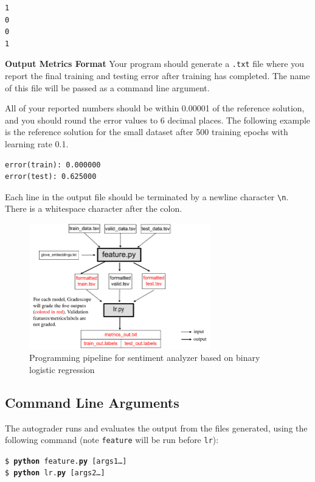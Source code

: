 \documentclass[11pt,addpoints,answers]{exam}
\begin{document}
\begin{lstlisting}
1
0
0
1
\end{lstlisting}

{\bf Output Metrics Format }
Your program should generate a \texttt{.txt} file where you report the final training and testing error after training has completed. The name of this file will be passed as a command line argument.

All of your reported numbers should be within 0.00001 of the reference solution, and you should round the error values to 6 decimal places. The following example is the reference solution for the small dataset after 500 training epochs with learning rate 0.1.
\begin{lstlisting}
error(train): 0.000000
error(test): 0.625000
\end{lstlisting}

Each line in the output file should be terminated by a newline character \lstinline{\n}. There is a whitespace character after the colon.

\begin{figure}[H]
        \centering
        \includegraphics[width = 0.7\textwidth]{fig/Pipeline_v5.png}
        \caption{Programming pipeline for sentiment analyzer based on binary logistic regression}
        \label{pipeline}
\end{figure}

\subsection{Command Line Arguments}\label{commandline}
The autograder runs and evaluates the output from the files generated, using the following command (note \lstinline{feature} will be run before \lstinline{lr}):

\begin{tabbing}
\=\texttt{\$ \textbf{python} feature.\textbf{py} [args1\dots]}\\
\>\texttt{\$ \textbf{python} lr.\textbf{py} [args2\dots]}
\end{tabbing}
\end{document}
